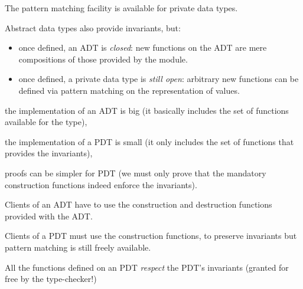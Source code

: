 The pattern matching facility is available for private data types.

\vfill


Abstract data types also provide invariants, but:

\begin{itemize}

 \item once defined, an ADT is {\em closed}: new functions on the ADT
are mere compositions of those provided by the module.

 \item once defined, a private data type is {\em still open}: arbitrary new
functions can be defined via pattern matching on the representation of
values.

\end{itemize}


\begin{citemize}
  \item the implementation of an ADT is big (it basically includes the set
of functions available for the type),

  \item the implementation of a PDT is small (it only includes the set of functions
that provides the invariants),
  \item proofs can be simpler for PDT (we must only prove that the
mandatory construction functions indeed enforce the invariants).
\end{citemize}


Clients of an ADT have to use the construction and destruction
functions provided with the ADT.

Clients of a PDT must use the construction functions, to preserve
invariants but pattern matching is still freely available.

All the functions defined on an PDT {\em respect} the PDT's invariants
(granted for free by the type-checker!)
